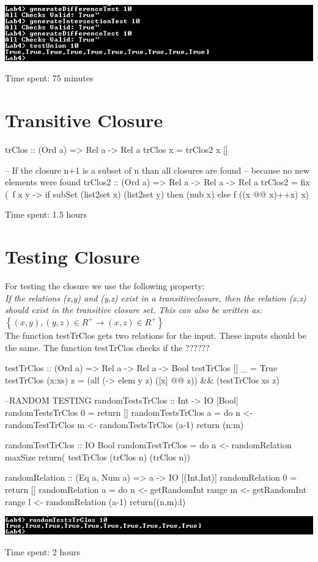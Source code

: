 \documentclass{article}
\begin{document}
\includegraphics{knipsel}

\newpage
Time spent: 75 minutes

\section*{Transitive Closure}
\begin{code}
trClos :: (Ord a) => Rel a -> Rel a
trClos x = trClos2 x []

-- If the closure n+1 is a subset of n than all closures are found
-- because no new elements were found
trClos2 :: (Ord a) => Rel a -> Rel a -> Rel a
trClos2  = fix (\ f x y ->
           if subSet (list2set x) (list2set y) then (nub x)
           else f ((x @@ x)++x) x) 
\end{code}

Time spent: 1.5 hours

\section*{Testing Closure}
For testing the closure we use the following property: \\
\emph{If the relations (x,y) and (y,z) exist in a transitiveclosure, then the relation (x,z) should exist in the transitive closure set. This can also be written as: \\
$\left\{ (x,y) , (y,z) \in R^+ \rightarrow(x,z) \in R^+ \right\}$}\\

The function testTrClos gets two relations for the input. These inputs should be the same. The function testTrClos checks if the ??????

\begin{code}
testTrClos :: (Ord a) => Rel a -> Rel a -> Bool
testTrClos [] _ = True
testTrClos (x:xs) z = (all (\y -> elem y z) ([x] @@ z)) && (testTrClos xs z)

--RANDOM TESTING
randomTestsTrClos :: Int -> IO [Bool]
randomTestsTrClos 0 = return []
randomTestsTrClos a = do 	n <- randomTestTrClos
				m <- randomTestsTrClos (a-1)
				return (n:m)

randomTestTrClos :: IO Bool
randomTestTrClos = do 	n <- randomRelation maxSize
			return( testTrClos (trClos n) (trClos n)) 

randomRelation :: (Eq a, Num a) => a -> IO [(Int,Int)]
randomRelation 0 = return []
randomRelation a = do 	n <- getRandomInt range
			m <- getRandomInt range
			l <- randomRelation (a-1)
			return((n,m):l) 

\end{code}

\includegraphics{knipsel2}

Time spent: 2 hours
\end{document}
